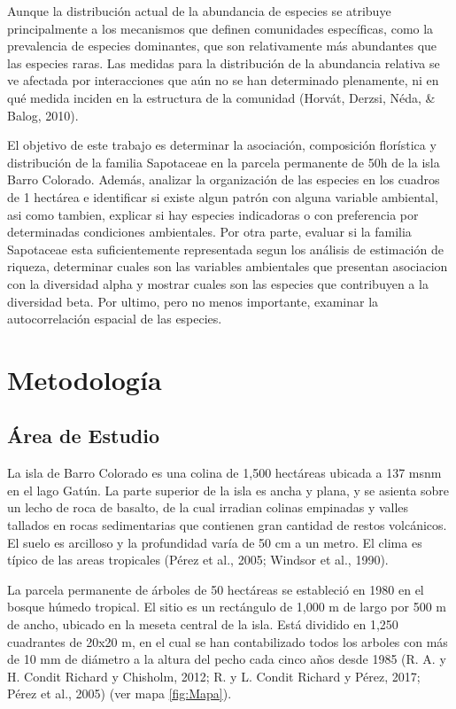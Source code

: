 \documentclass[11pt,]{article}
\begin{document}
Aunque la distribución actual de la abundancia de especies se atribuye
principalmente a los mecanismos que definen comunidades específicas,
como la prevalencia de especies dominantes, que son relativamente más
abundantes que las especies raras. Las medidas para la distribución de
la abundancia relativa se ve afectada por interacciones que aún no se
han determinado plenamente, ni en qué medida inciden en la estructura de
la comunidad (Horvát, Derzsi, Néda, \& Balog, 2010).

El objetivo de este trabajo es determinar la asociación, composición
florística y distribución de la familia Sapotaceae en la parcela
permanente de 50h de la isla Barro Colorado. Además, analizar la
organización de las especies en los cuadros de 1 hectárea e identificar
si existe algun patrón con alguna variable ambiental, asi como tambien,
explicar si hay especies indicadoras o con preferencia por determinadas
condiciones ambientales. Por otra parte, evaluar si la familia
Sapotaceae esta suficientemente representada segun los análisis de
estimación de riqueza, determinar cuales son las variables ambientales
que presentan asociacion con la diversidad alpha y mostrar cuales son
las especies que contribuyen a la diversidad beta. Por ultimo, pero no
menos importante, examinar la autocorrelación espacial de las especies.

\section{Metodología}\label{metodologuxeda}

\subsection{Área de Estudio}\label{uxe1rea-de-estudio}

La isla de Barro Colorado es una colina de 1,500 hectáreas ubicada a 137
msnm en el lago Gatún. La parte superior de la isla es ancha y plana, y
se asienta sobre un lecho de roca de basalto, de la cual irradian
colinas empinadas y valles tallados en rocas sedimentarias que contienen
gran cantidad de restos volcánicos. El suelo es arcilloso y la
profundidad varía de 50 cm a un metro. El clima es típico de las areas
tropicales (Pérez et al., 2005; Windsor et al., 1990).

La parcela permanente de árboles de 50 hectáreas se estableció en 1980
en el bosque húmedo tropical. El sitio es un rectángulo de 1,000 m de
largo por 500 m de ancho, ubicado en la meseta central de la isla. Está
dividido en 1,250 cuadrantes de 20x20 m, en el cual se han contabilizado
todos los arboles con más de 10 mm de diámetro a la altura del pecho
cada cinco años desde 1985 (R. A. y H. Condit Richard y Chisholm, 2012;
R. y L. Condit Richard y Pérez, 2017; Pérez et al., 2005) (ver mapa
\ref{fig:Mapa}).
\end{document}
